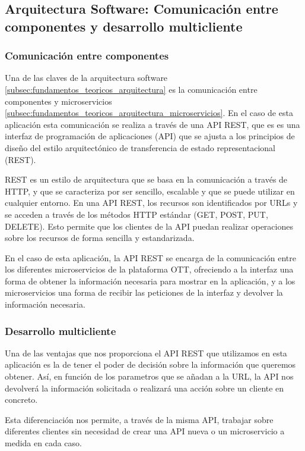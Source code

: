 \subsection{Arquitectura Software: Comunicación entre componentes y desarrollo multicliente}
\label{subsec:arquitectura_software}

\subsubsection{Comunicación entre componentes}
\label{subsec:arquitectura_software_comunicacion}

Una de las claves de la arquitectura software \ref{subsec:fundamentos_teoricos_arquitectura} es la 
comunicación entre componentes y microservicios \ref{subsec:fundamentos_teoricos_arquitectura_microservicios}.
En el caso de esta aplicación esta comunicación se realiza a través de una API REST, que es es una interfaz 
de programación de aplicaciones (API) que se ajusta a los principios de diseño del estilo arquitectónico de 
transferencia de estado representacional (REST). 

REST es un estilo de arquitectura que se basa en la comunicación a través de HTTP, y que se caracteriza por
ser sencillo, escalable y que se puede utilizar en cualquier entorno. En una API REST, los recursos son
identificados por URLs y se acceden a través de los métodos HTTP estándar (GET, POST, PUT, DELETE).
Esto permite que los clientes de la API puedan realizar operaciones sobre los recursos de forma sencilla y
estandarizada.

En el caso de esta aplicación, la API REST se encarga de la comunicación entre los diferentes microservicios
de la plataforma OTT, ofreciendo a la interfaz una forma de obtener la información necesaria para mostrar
en la aplicación, y a los microservicios una forma de recibir las peticiones de la interfaz y devolver la
información necesaria.

\subsubsection{Desarrollo multicliente}
\label{subsec:arquitectura_software_multicliente}

Una de las ventajas que nos proporciona el API REST que utilizamos en esta aplicación es la de tener el poder
de decisión sobre la información que queremos obtener. Así, en función de los parametros que se añadan a la
URL, la API nos devolverá la información solicitada o realizará una acción sobre un cliente en concreto.

Esta diferenciación nos permite, a través de la misma API, trabajar sobre diferentes clientes sin necesidad
de crear una API nueva o un microservicio a medida en cada caso. 